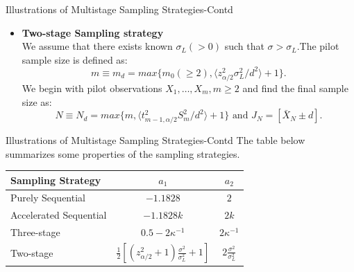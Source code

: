 \documentclass [xcolor=svgnames, t] {beamer}
\begin{document}
\begin{frame}{Illustrations of Multistage Sampling Strategies-Contd}
  \vspace{5mm}
    \begin{itemize}

\item \textbf{Two-stage Sampling strategy}
    \\ We assume that there exists known $\sigma_L(>0)$ such that $\sigma>\sigma_L$.The pilot sample size is defined as:
    $$m\equiv m_d=max \{ m_0(\ge 2), \langle z^2_{\alpha/2}\sigma_L^2/d^2 \rangle+1\}.$$
    We begin with pilot observations $X_1,\dots ,X_m, m \ge 2$ and find the final sample size as:
    \begin{equation*}
    N \equiv N_d=max\{ m,\langle t^2_{m-1,\alpha/2}S_m^2/d^2 \rangle+1\} \text{ and } J_N=[\bar{X}_N \pm d].
\end{equation*}

    \end{itemize}
\end{frame}


\begin{frame}{Illustrations of Multistage Sampling Strategies-Contd}
  \vspace{5mm}
    The table below summarizes some properties of the sampling strategies.
\begin{center}
\begin{tabular}{l c c} 
 \hline
 Sampling Strategy & $a_1$ & $a_2$ \\
 \hline
 Purely Sequential & $-1.1828$ & $2$  \\ 
Accelerated Sequential & $-1.1828k$ & $2k$  \\ 
Three-stage & $0.5-2\kappa^{-1}$ & $2\kappa^{-1}$  \\ 
 Two-stage & $\frac{1}{2}[(z^2_{\alpha/2}+1)\frac{\sigma^2}{\sigma^2_L}+1]$ & $2\frac{\sigma^2}{\sigma^2_L}$ \\
 \hline
\end{tabular}
\end{center}
\end{frame}
\end{document}
